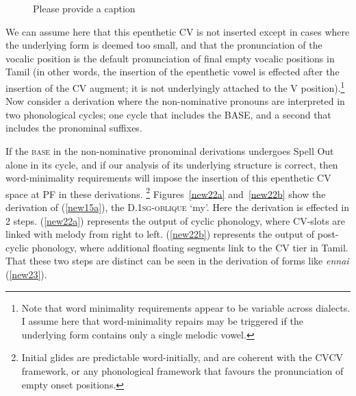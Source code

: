 \documentclass[output=paper]{langscibook}
\begin{document}
\begin{figure}
\begin{minipage}{.25\textwidth}
    \end{minipage}
    \caption{\color{red}Please provide a caption}
    \label{new21}
\end{figure}

We can assume here that this epenthetic CV is not inserted except in cases where the underlying form is deemed too small, and that the pronunciation of the vocalic position is the default pronunciation of final empty vocalic positions in Tamil (in other words, the insertion of the epenthetic vowel is effected after the insertion of the CV augment; it is not underlyingly attached to the V position).\footnote{Note that word minimality requirements appear to be variable across dialects. I assume here that word-minimality repairs may be triggered if the underlying form contains only a single melodic vowel.}  Now consider a derivation where the non-nominative pronouns are interpreted in two phonological cycles; one cycle that includes the BASE, and a second that includes the pronominal suffixes. 

If the \textsc{base} in the non-nominative pronominal derivations undergoes Spell Out alone in its cycle, and if our analysis of its underlying structure is correct, then word-minimality requirements will impose the insertion of this epenthetic CV space at PF in these derivations.%
    \footnote{Initial glides are predictable word-initially, and are coherent with the CVCV framework, or any phonological framework that favours the pronunciation of empty onset positions.} 
Figures~\ref{new22a} and~\ref{new22b} show the derivation of (\ref{new15a}), the D.1\textsc{sg-oblique} ‘my’. Here the derivation is effected in 2 steps. (\ref{new22a}) represents the output of cyclic phonology, where CV-slots are linked with melody from right to left. (\ref{new22b}) represents the output of post-cyclic phonology, where additional floating segments link to the CV tier in Tamil. That these two steps are distinct can be seen in the derivation of forms like \textit{ennai} (\ref{new23}).
\end{document}
